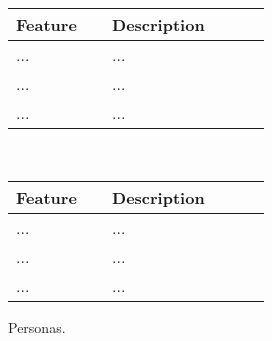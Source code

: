 \documentclass[../report.tex]{subfiles}
\begin{document}
\begin{figure*}
\def\arraystretch{1.5}
\centering
\begin{tabular}{|p{0.3\linewidth}|p{0.5\linewidth}|}
\hline
Feature & Description \\
\hline
... & ... \\ 
... & ... \\ 
... & ... \\ 
\hline
\end{tabular}
\vspace{0.5cm} \\
\begin{tabular}{|p{0.3\linewidth}|p{0.5\linewidth}|}
\hline
Feature & Description \\
\hline
... & ... \\ 
... & ... \\ 
... & ... \\ 
\hline
\end{tabular}
\caption{Personas.}
\label{fig:personas}
\end{figure*}
\end{document}
